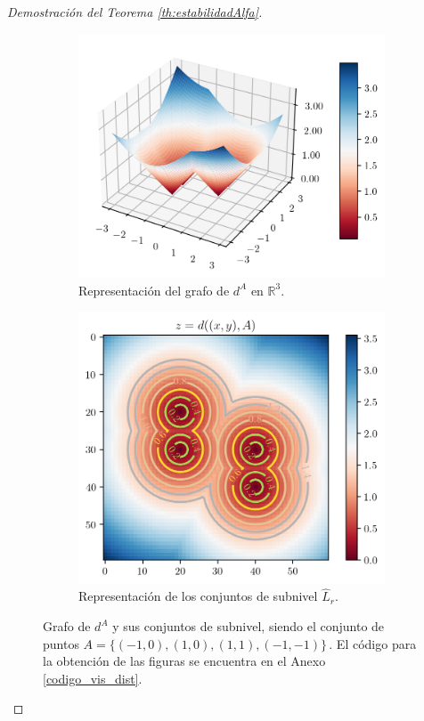 \begin{proof}[Demostración del Teorema \ref{th:estabilidadAlfa}]
\begin{figure}[!ht]
\centering
\begin{subfigure}{0.45\textwidth}
\centering
\includegraphics[width=\textwidth]{../code/output/grafoDistancias.png} 
\caption{Representación del grafo de $d^A$ en $\mathbb{R}^3$.}
\label{ref:grafoDistConj}
\end{subfigure}\hspace{0.1\textwidth}%
\begin{subfigure}{0.45\textwidth}
\centering
\includegraphics[width=\textwidth]{../code/output/subnivelDistancias.png} 
\caption{Representación de los conjuntos de subnivel $\widehat{L}_r$.}
\label{ref:subnivelDistConj}
\end{subfigure}
\caption{Grafo de $d^A$ y sus conjuntos de subnivel, siendo el conjunto de puntos $A = \{(-1, 0), (1, 0), (1, 1), (-1, -1)\}\,$. El código para la obtención de las figuras se encuentra en el Anexo \ref{codigo_vis_dist}.}
\label{ref:figDistConj}
\end{figure}


\end{proof}
